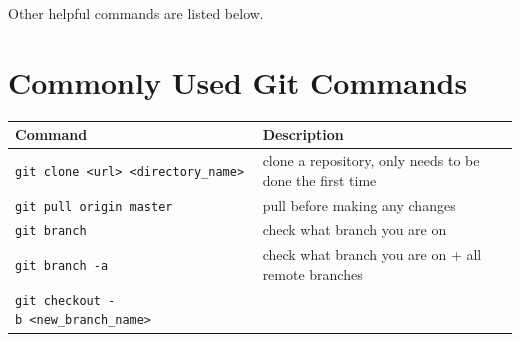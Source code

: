\documentclass[]{book}
\begin{document}
Other helpful commands are listed below.

\hypertarget{commonly-used-git-commands}{%
\section{Commonly Used Git Commands}\label{commonly-used-git-commands}}

\begin{longtable}[]{@{}ll@{}}
\toprule
\begin{minipage}[b]{0.34\columnwidth}\raggedright
Command\strut
\end{minipage} & \begin{minipage}[b]{0.60\columnwidth}\raggedright
Description\strut
\end{minipage}\tabularnewline
\midrule
\endhead
\begin{minipage}[t]{0.34\columnwidth}\raggedright
\texttt{git\ clone\ \textless{}url\textgreater{}\ \textless{}directory\_name\textgreater{}}\strut
\end{minipage} & \begin{minipage}[t]{0.60\columnwidth}\raggedright
clone a repository, only needs to be done the first time\strut
\end{minipage}\tabularnewline
\begin{minipage}[t]{0.34\columnwidth}\raggedright
\texttt{git\ pull\ origin\ master}\strut
\end{minipage} & \begin{minipage}[t]{0.60\columnwidth}\raggedright
pull before making any changes\strut
\end{minipage}\tabularnewline
\begin{minipage}[t]{0.34\columnwidth}\raggedright
\texttt{git\ branch}\strut
\end{minipage} & \begin{minipage}[t]{0.60\columnwidth}\raggedright
check what branch you are on\strut
\end{minipage}\tabularnewline
\begin{minipage}[t]{0.34\columnwidth}\raggedright
\texttt{git\ branch\ -a}\strut
\end{minipage} & \begin{minipage}[t]{0.60\columnwidth}\raggedright
check what branch you are on + all remote branches\strut
\end{minipage}\tabularnewline
\begin{minipage}[t]{0.34\columnwidth}\raggedright
\texttt{git\ checkout\ -b\ \textless{}new\_branch\_name\textgreater{}}\strut

\end{minipage}
\end{longtable}
\end{document}
